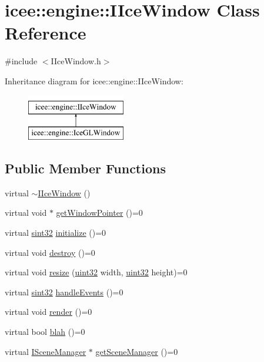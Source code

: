 \hypertarget{classicee_1_1engine_1_1IIceWindow}{
\section{icee::engine::IIceWindow Class Reference}
\label{classicee_1_1engine_1_1IIceWindow}
}


{\ttfamily \#include $<$IIceWindow.h$>$}

Inheritance diagram for icee::engine::IIceWindow:\begin{figure}[H]
\begin{center}
\leavevmode
\includegraphics[height=2.000000cm]{classicee_1_1engine_1_1IIceWindow}
\end{center}
\end{figure}
\subsection*{Public Member Functions}
\begin{DoxyCompactItemize}
\item 
virtual \hyperlink{classicee_1_1engine_1_1IIceWindow_aaadd780b12a5cc13271c40ece6132266}{$\sim$IIceWindow} ()
\item 
virtual void $\ast$ \hyperlink{classicee_1_1engine_1_1IIceWindow_ae2ddf86f1599fd3d58d5f048e9daf5eb}{getWindowPointer} ()=0
\item 
virtual \hyperlink{namespacecompatibility_afc3ea6dfbdda98c9d2615b235b140a18}{sint32} \hyperlink{classicee_1_1engine_1_1IIceWindow_a5d7d7d89d028ccbef90caa600259b3e1}{initialize} ()=0
\item 
virtual void \hyperlink{classicee_1_1engine_1_1IIceWindow_a8c95b751fbd4e410390499c4e04913a7}{destroy} ()=0
\item 
virtual void \hyperlink{classicee_1_1engine_1_1IIceWindow_a5f89b1a117bdeb33d0a932e30b19caa2}{resize} (\hyperlink{namespacecompatibility_a51e8fe2956b4f39fe1fae96cec0d8393}{uint32} width, \hyperlink{namespacecompatibility_a51e8fe2956b4f39fe1fae96cec0d8393}{uint32} height)=0
\item 
virtual \hyperlink{namespacecompatibility_afc3ea6dfbdda98c9d2615b235b140a18}{sint32} \hyperlink{classicee_1_1engine_1_1IIceWindow_a48d4b1589c43d030d0d307dc36d608f3}{handleEvents} ()=0
\item 
virtual void \hyperlink{classicee_1_1engine_1_1IIceWindow_ad98b0505e03b1979e75ff1673edfa17f}{render} ()=0
\item 
virtual bool \hyperlink{classicee_1_1engine_1_1IIceWindow_afd79bc3368348b54b1c98745d206f2a5}{blah} ()=0
\item 
virtual \hyperlink{classicee_1_1engine_1_1ISceneManager}{ISceneManager} $\ast$ \hyperlink{classicee_1_1engine_1_1IIceWindow_ac67a17339f3ab2c2996de03f3bfbdf3b}{getSceneManager} ()=0
\end{DoxyCompactItemize}
